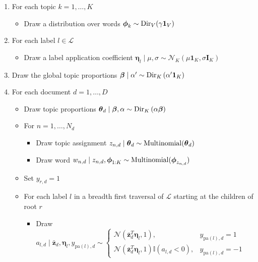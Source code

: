 \begin{enumerate}
\item For each topic $k=1,\ldots,K$

\begin{itemize}
\item Draw a distribution over words $\boldsymbol\phi_{k}\sim{\rm Dir}_{V}(\gamma\mathbf{1}_V)$%
\end{itemize}
\item For each label $l\in\mathcal{L}$

\begin{itemize}
\item Draw a label application coefficient $\boldsymbol\eta_{l}\mid\mu,\sigma\sim\mathcal{N}_{K}(\mu \mathbf{1}_K,\sigma \mathbf{I}_{K})$  
\end{itemize}
\item Draw the global topic proportions $\boldsymbol\beta\mid\alpha'\sim{\rm Dir}_{K}\left(\alpha^{\prime}\mathbf{1}_K\right)$
\item For each document $d=1,\ldots,D$

\begin{itemize}
\item Draw topic proportions $\boldsymbol\theta_d\mid\boldsymbol\beta,\alpha\sim{\rm Dir}_{K}\left(\alpha\boldsymbol\beta\right)$ 
\item For $n=1,\ldots,N_{d}$

\begin{itemize}
\item Draw topic assignment $z_{n,d}\mid\boldsymbol\theta_d\sim{\rm Multinomial}(\boldsymbol\theta_d)$ 
\item Draw word $w_{n,d}\mid z_{n,d},\boldsymbol\phi_{1:K}\sim{\rm Multinomial}(\boldsymbol\phi_{z_{n,d}})$ 
\end{itemize}
\item Set $y_{r,d} = 1$
\item For each label $l$ in a breadth first traversal of $\mathcal{L}$ starting at the children of  root $r$

\begin{itemize}
\item Draw $a_{l,d}\mid \bar{\mathbf{z}}_d,\boldsymbol\eta_{l},y_{\mathrm{pa}(l),d}\sim\begin{cases}
\mathcal{N}(\bar{\mathbf{z}}^{T}_d\boldsymbol\eta_{l},1), & y_{\mathrm{pa}(l),d}=1\\
\mathcal{N}(\bar{\mathbf{z}}^{T}_d\boldsymbol\eta_{l},1)\mathbb{I}(a_{l,d}<0), & y_{\mathrm{pa}(l),d}=-1\end{cases}$ %
 

\end{itemize}
\end{itemize}
\end{enumerate}
